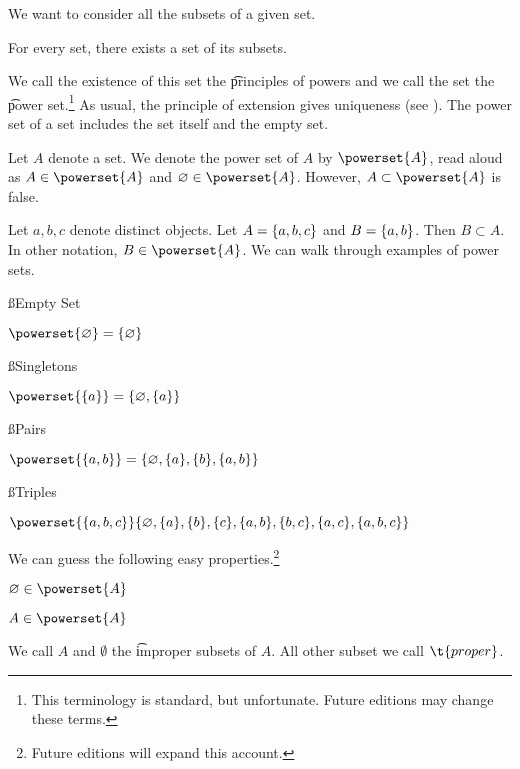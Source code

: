

We want to consider all the subsets of a given set.

\begin{principle}[Powers]
  For every set, there exists a set of its subsets.
\end{principle}

We call the existence of this set the \t{principles of powers} and we call the set the \t{power set}.\footnote{This terminology is standard, but unfortunate. Future editions may change these terms.}
As usual, the principle of extension gives uniqueness (see ).
The power set of a set includes the set itself and the empty set.


Let $A$ denote a set.
We denote the power set of $A$ by $\powerset{A}$, read aloud as 
$A \in \powerset{A}$ and $\emptyset \in \powerset{A}$.
However, $A \subset \powerset{A}$ is false.


Let $a, b, c$ denote distinct objects. Let $A = \{a, b ,c\}$
and $B = \{a, b\}$. Then
$B \subset A$.
In other notation,
$B \in \powerset{A}$.
We can walk through examples of power sets.

\ss{Empty Set}

\begin{proposition}
  $\powerset{\emptyset} = \set{\emptyset}$
\end{proposition}

\ss{Singletons}

\begin{proposition}
  $\powerset{\set{a}} = \set{\emptyset, \set{a}}$
\end{proposition}

\ss{Pairs}

\begin{proposition}
  $\powerset{\set{a, b}} = \set{\emptyset, \set{a}, \set{b}, \set{a, b}}$
\end{proposition}

\ss{Triples}

\begin{proposition}
  $\powerset{\set{a, b, c}}
  \set{
    \emptyset,
    \set{a},
    \set{b},
    \set{c},
    \set{a, b},
    \set{b, c},
    \set{a, c},
    \set{a, b, c}
  }$
\end{proposition}


We can guess the following easy properties.\footnote{Future editions will expand this account.}

\begin{proposition}
  $\emptyset \in \powerset{A}$
\end{proposition}

\begin{proposition}
  $A \in \powerset{A}$
\end{proposition}

We call $A$ and $\emptyset$ the \t{improper} subsets of $A$.
All other subset we call $\t{proper}$.

\blankpage

